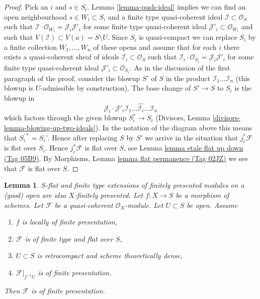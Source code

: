\documentclass{amsart}
\newenvironment{slogan}{\comment}{\endcomment}
\theoremstyle{plain}
\newtheorem{lemma}[subsection]{Lemma}
\theoremstyle{definition}
\theoremstyle{remark}
\numberwithin{equation}{subsection}
\begin{document}
\begin{proof}
\medskip\noindent
Pick an $i$ and $s \in S_i$. Lemma \ref{lemma-push-ideal}
implies we can find an open neighbourhood $s \in W_i \subset S_i$
and a finite type quasi-coherent ideal $\mathcal{I} \subset \mathcal{O}_S$
such that $\mathcal{I} \cdot \mathcal{O}_{W_i} = \mathcal{J}_i \mathcal{J}'_i$
for some finite type quasi-coherent ideal
$\mathcal{J}'_i \subset \mathcal{O}_{W_i}$
and such that $V(\mathcal{I}) \subset V(a) = S \setminus U$.
Since $S_i$ is quasi-compact we can replace $S_i$ by a finite collection
$W_1, \ldots, W_n$ of these opens and assume that for each $i$ there exists
a quasi-coherent sheaf of ideals $\mathcal{I}_i \subset \mathcal{O}_S$ such
that $\mathcal{I}_i \cdot \mathcal{O}_{S_i} = \mathcal{J}_i \mathcal{J}'_i$
for some finite type quasi-coherent ideal
$\mathcal{J}'_i \subset \mathcal{O}_{S_i}$.
As in the discussion of the first paragraph of the proof, consider the
blowup $S'$ of $S$ in the product $\mathcal{I}_1 \ldots \mathcal{I}_n$
(this blowup is $U$-admissible by construction). The base change of $S' \to S$
to $S_i$ is the blowup in
$$
\mathcal{J}_i \cdot
\mathcal{J}'_i \mathcal{I}_1 \ldots \hat{\mathcal{I}_i} \ldots \mathcal{I}_n
$$
which factors through the given blowup $S_i^* \to S_i$
(Divisors, Lemma \ref{divisors-lemma-blowing-up-two-ideals}). In the notation
of the diagram above this means that $S_i^{\prime *} = S_i'$. Hence
after replacing $S$ by $S'$ we arrive in the situation that
$j_i^*\mathcal{F}$ is flat over $S_i$. Hence $j_i^*\mathcal{F}$ is flat
over $S$, see
Lemma \href{https://stacks.math.columbia.edu/tag/05B9}{lemma etale flat up down (Tag 05B9)}.
By Morphisms, Lemma \href{https://stacks.math.columbia.edu/tag/02JZ}{lemma flat permanence (Tag 02JZ)}
we see that $\mathcal{F}$ is flat over $S$.
\end{proof}


\begin{lemma}
\label{lemma-flat-finite-type-finitely-presented-over-dense-open}
\begin{slogan}
$S$-flat and finite type extensions of finitely presented modules
on a (good) open are also $X$-finitely presented.
\end{slogan}
Let $f : X \to S$ be a morphism of schemes. Let $\mathcal{F}$ be a
quasi-coherent $\mathcal{O}_X$-module. Let $U \subset S$ be open.
Assume
\begin{enumerate}
\item $f$ is locally of finite presentation,
\item $\mathcal{F}$ is of finite type and flat over $S$,
\item $U \subset S$ is retrocompact and scheme theoretically dense,
\item $\mathcal{F}|_{f^{-1}U}$ is of finite presentation.
\end{enumerate}
Then $\mathcal{F}$ is of finite presentation.
\end{lemma}
\end{document}
